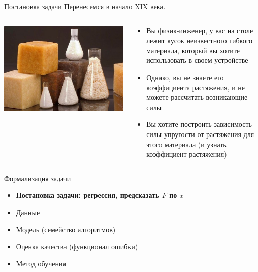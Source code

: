 \documentclass[aspectratio=169]{beamer}
\begin{document}
\begin{frame}{Постановка задачи}
    Перенесемся в начало XIX века.
    \vfill
    \begin{columns}
        \begin{column}{.4\linewidth}
            \includegraphics[width=\linewidth]{graphs/fig2.jpg}
        \end{column}
        \begin{column}{.6\linewidth}
            \small
            \begin{itemize}
                \item Вы физик-инженер, у вас на столе лежит кусок неизвестного гибкого материала,
                который вы хотите использовать в своем устройстве
                \pause{}
                \item Однако, вы не знаете его коэффициента растяжения, и не можете рассчитать
                возникающие силы
                \pause{}
                \item Вы хотите построить зависимость силы упругости от растяжения для этого
                материала (и узнать коэффициент растяжения)
            \end{itemize}
        \end{column}
    \end{columns}
\end{frame}

\begin{frame}{Формализация задачи}
    \begin{itemize}
        \item \textbf{Постановка задачи: регрессия, предсказать \( F \) по \( x \)}
        \item Данные
        \item Модель (семейство алгоритмов)
        \item Оценка качества (функционал ошибки)
        \item Метод обучения
    \end{itemize}
\end{frame}
\end{document}
